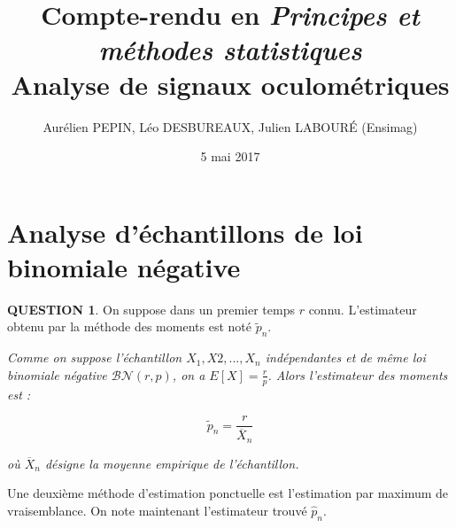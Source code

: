 \documentclass[a4paper,11pt]{article}
\title{Compte-rendu en \textit{Principes et méthodes statistiques} \\
\textbf{Analyse de signaux oculométriques}}
\author{Aurélien PEPIN, Léo DESBUREAUX, Julien LABOUR\'{E} (Ensimag)}
\date{5 mai 2017}
\newcommand{\quest}[1]{\small\textbf{#1}\normalsize}
\theoremstyle{nonumberplain}
\theoremstyle{nonumberplain}
\theoremstyle{nonumberplain}
\begin{document}
\maketitle

\section{Analyse d'échantillons de loi binomiale négative}

    \quest{QUESTION 1}. On suppose dans un premier temps $r$ connu. L'estimateur
    obtenu par la méthode des moments est noté $\tilde{p}_n$.

    \begin{calculs}
        \hspace{-1ex}\emph{Comme on suppose l'échantillon $X_1, X2, ..., X_n$ indépendantes
        et de même loi binomiale négative $\mathcal{BN}(r, p)$, on a $E[X] = \frac{r}{p}$. Alors
        l'estimateur des moments est :}

        $$\tilde{p}_n = \frac{r}{\overline{X}_n}$$

        \emph{où $\overline{X}_n$ désigne la moyenne empirique de l'échantillon.}
    \end{calculs}

    Une deuxième méthode d'estimation ponctuelle est l'estimation par maximum de
    vraisemblance. On note maintenant l'estimateur trouvé $\hat{p}_n$.
\end{document}
